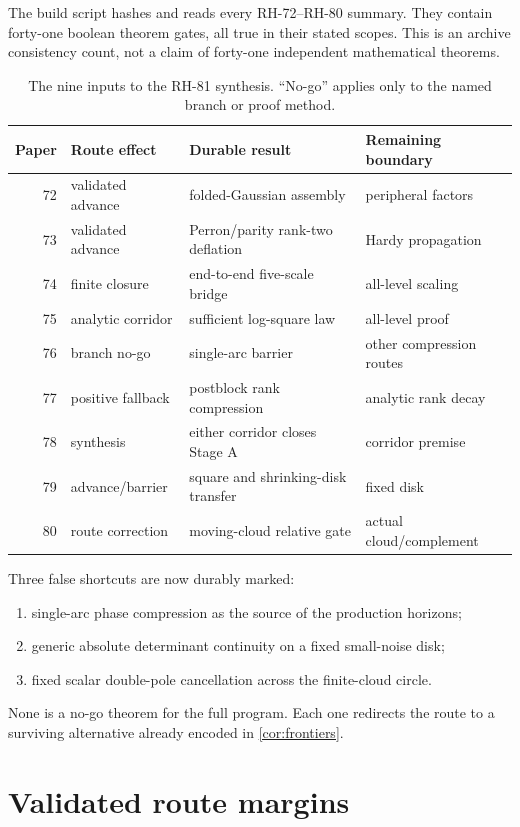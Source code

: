 \documentclass[11pt]{article}
\theoremstyle{definition}
\theoremstyle{remark}
\begin{document}
The build script hashes and reads every RH-72--RH-80 summary.  They contain
forty-one boolean theorem gates, all true in their stated scopes.  This is an
archive consistency count, not a claim of forty-one independent mathematical
theorems.

\begin{table}[ht]
\centering
\small
\begin{tabular}{rlll}
\toprule
Paper & Route effect & Durable result & Remaining boundary\\
\midrule
72 & validated advance & folded-Gaussian assembly & peripheral factors\\
73 & validated advance & Perron/parity rank-two deflation & Hardy propagation\\
74 & finite closure & end-to-end five-scale bridge & all-level scaling\\
75 & analytic corridor & sufficient log-square law & all-level proof\\
76 & branch no-go & single-arc barrier & other compression routes\\
77 & positive fallback & postblock rank compression & analytic rank decay\\
78 & synthesis & either corridor closes Stage A & corridor premise\\
79 & advance/barrier & square and shrinking-disk transfer & fixed disk\\
80 & route correction & moving-cloud relative gate & actual cloud/complement\\
\bottomrule
\end{tabular}
\caption{The nine inputs to the RH-81 synthesis.  ``No-go'' applies only to
the named branch or proof method.}
\label{tab:ledger}
\end{table}

Three false shortcuts are now durably marked:
\begin{enumerate}[leftmargin=2em]
 \item single-arc phase compression as the source of the production horizons;
 \item generic absolute determinant continuity on a fixed small-noise disk;
 \item fixed scalar double-pole cancellation across the finite-cloud circle.
\end{enumerate}
None is a no-go theorem for the full program.  Each one redirects the route to
a surviving alternative already encoded in \cref{cor:frontiers}.

\section{Validated route margins}
\end{document}
